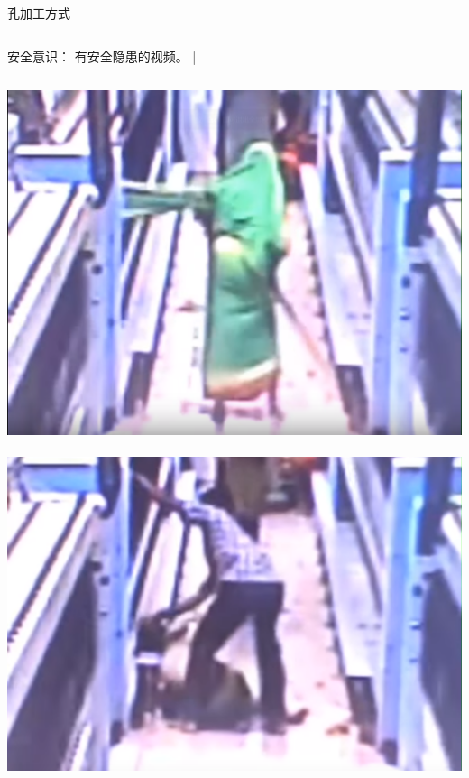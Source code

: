\documentclass[utf8,zihao=-4,handout,smaller,aspectratio=1610]{ctexbeamer}
\begin{document}
\begin{frame}{孔加工方式}
	\begin{columns}
		\begin{block}{安全意识：}
			有安全隐患的视频。
			|\end{block}
	\end{columns}
	
	\vspace{25pt}
	
	\includegraphics[width=.5\linewidth,trim=0 0 0  0,clip,angle=0]{image/anquan3.png}~
	\includegraphics[width=0.5\linewidth,trim=0 0 0 0,clip,angle=0]{image/anquan4.png}
	
\end{frame}
\end{document}
